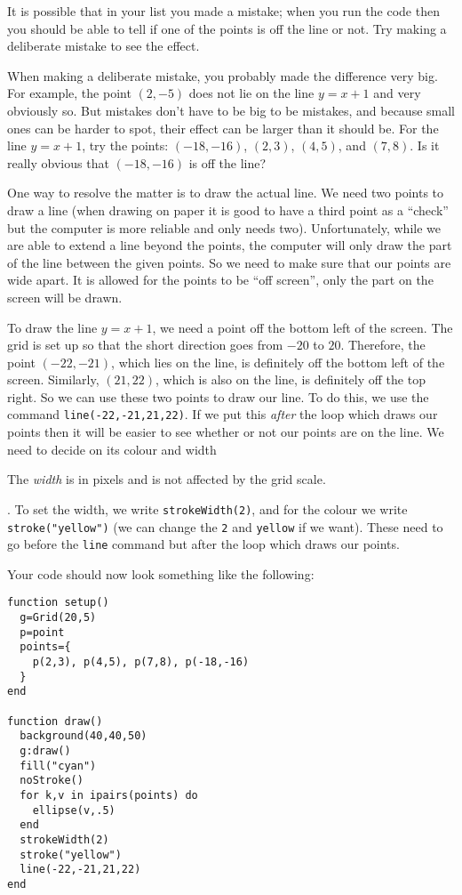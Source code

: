 \documentclass[
  xhtml,%
  use filename%
]{internet}
\begin{document}
It is possible that in your list you made a mistake; when you run the code then you should be able to tell if one of the points is off the line or not.
Try making a deliberate mistake to see the effect.

When making a deliberate mistake, you probably made the difference very big.
For example, the point \((2,-5)\) does not lie on the line \(y = x + 1\) and very obviously so.
But mistakes don't have to be big to be mistakes, and because small ones can be harder to spot, their effect can be larger than it should be.
For the line \(y = x + 1\), try the points:
\((-18,-16)\), \((2,3)\), \((4,5)\), and \((7,8)\).
Is it really obvious that \((-18,-16)\) is off the line?

One way to resolve the matter is to draw the actual line.
We need two points to draw a line (when drawing on paper it is good to have a third point as a ``check'' but the computer is more reliable and only needs two).
Unfortunately, while we are able to extend a line beyond the points, the computer will only draw the part of the line between the given points.
So we need to make sure that our points are wide apart.
It is allowed for the points to be ``off screen'', only the part on the screen will be drawn.

To draw the line \(y = x + 1\), we need a point off the bottom left of the screen.
The grid is set up so that the short direction goes from  \(-20\) to \(20\).
Therefore, the point \((-22,-21)\), which lies on the line, is definitely off the bottom left of the screen.
Similarly, \((21,22)\), which is also on the line, is definitely off the top right.
So we can use these two points to draw our line.
To do this, we use the command \verb+line(-22,-21,21,22)+.
If we put this \emph{after} the loop which draws our points then it will be easier to see whether or not our points are on the line.
We need to decide on its colour and width\begin{marginpar}The \emph{width} is in pixels and is not affected by the grid scale.\end{marginpar}.
To set the width, we write \verb+strokeWidth(2)+, and for the colour we write \verb+stroke("yellow")+ (we can change the \verb+2+ and \verb+yellow+ if we want).
These need to go before the \verb+line+ command but after the loop which draws our points.

Your code should now look something like the following:

\begin{verbatim}
function setup()
  g=Grid(20,5)
  p=point
  points={
    p(2,3), p(4,5), p(7,8), p(-18,-16)
  }
end

function draw()
  background(40,40,50)
  g:draw()
  fill("cyan")
  noStroke()
  for k,v in ipairs(points) do
    ellipse(v,.5)
  end
  strokeWidth(2)
  stroke("yellow")
  line(-22,-21,21,22)
end
\end{verbatim}
\end{document}
